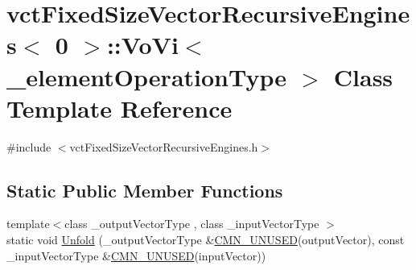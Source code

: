 \hypertarget{classvct_fixed_size_vector_recursive_engines_3_010_01_4_1_1_vo_vi}{\section{vct\-Fixed\-Size\-Vector\-Recursive\-Engines$<$ 0 $>$\-:\-:Vo\-Vi$<$ \-\_\-element\-Operation\-Type $>$ Class Template Reference}
\label{classvct_fixed_size_vector_recursive_engines_3_010_01_4_1_1_vo_vi}
}


{\ttfamily \#include $<$vct\-Fixed\-Size\-Vector\-Recursive\-Engines.\-h$>$}

\subsection*{Static Public Member Functions}
\begin{DoxyCompactItemize}
\item 
{\footnotesize template$<$class \-\_\-output\-Vector\-Type , class \-\_\-input\-Vector\-Type $>$ }\\static void \hyperlink{classvct_fixed_size_vector_recursive_engines_3_010_01_4_1_1_vo_vi_ac7f44929379177242a01e555560d504d}{Unfold} (\-\_\-output\-Vector\-Type \&\hyperlink{cmn_portability_8h_a021894e2626935fa2305434b1e893ff6}{C\-M\-N\-\_\-\-U\-N\-U\-S\-E\-D}(output\-Vector), const \-\_\-input\-Vector\-Type \&\hyperlink{cmn_portability_8h_a021894e2626935fa2305434b1e893ff6}{C\-M\-N\-\_\-\-U\-N\-U\-S\-E\-D}(input\-Vector))
\end{DoxyCompactItemize}


